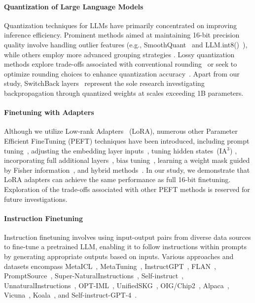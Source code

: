 \paragraph{Quantization of Large Language Models} Quantization techniques for LLMs have primarily concentrated on improving inference efficiency. Prominent methods aimed at maintaining 16-bit precision quality involve handling outlier features (e.g., SmoothQuant~\citep{xiao2022smoothquant} and LLM.int8()~\citep{dettmers2022llm}), while others employ more advanced grouping strategies \citep{park2022nuqmm, yao2022zeroquant}. Lossy quantization methods explore trade-offs associated with conventional rounding~\citep{dettmers2022case,zeng2022glm,pope2022efficiently} or seek to optimize rounding choices to enhance quantization accuracy~\citep{frantar2022gptq}. Apart from our study, SwitchBack layers~\citep{wortsman2023stable} represent the sole research investigating backpropagation through quantized weights at scales exceeding 1B parameters.

\paragraph{Finetuning with Adapters} Although we utilize Low-rank Adapters~\citep{hu2021lora} (LoRA), numerous other Parameter Efficient FineTuning (PEFT) techniques have been introduced, including prompt tuning~\citep{qin2021learning,lester2021power,li2021prefix}, adjusting the embedding layer inputs~\citep{an2022input}, tuning hidden states~(IA$^3$) \citep{liu2022few}, incorporating full additional layers~\citep{houlsby2019parameter}, bias tuning~\citep{zaken2021bitfit}, learning a weight mask guided by Fisher information~\citep{sung2021training}, and hybrid methods~\citep{henderson2021compacter}. In our study, we demonstrate that LoRA adapters can achieve the same performance as full 16-bit finetuning. Exploration of the trade-offs associated with other PEFT methods is reserved for future investigations.

\paragraph{Instruction Finetuning} Instruction finetuning involves using input-output pairs from diverse data sources to fine-tune a pretrained LLM, enabling it to follow instructions within prompts by generating appropriate outputs based on inputs. Various approaches and datasets encompass MetaICL~\citep{min2021metaicl}, MetaTuning~\citep{zhong2021adapting}, InstructGPT~\citep{ouyang2022training}, FLAN~\citep{wei2021finetuned,chung2022scaling}, PromptSource~\citep{bach2022promptsource}, Super-NaturalInstructions~\citep{wang2022super,sanh2021multitask}, Self-instruct~\citep{wang2022self}, UnnaturalInstructions~\citep{honovich2022unnatural}, OPT-IML~\citep{iyer2022opt}, UnifiedSKG~\citep{xie2022unifiedskg}, OIG/Chip2~\citep{laion2023}, Alpaca~\citep{alpaca}, Vicuna~\citep{vicuna2023}, Koala~\citep{koala_blogpost_2023}, and Self-instruct-GPT-4~\citep{peng2023instruction}.

